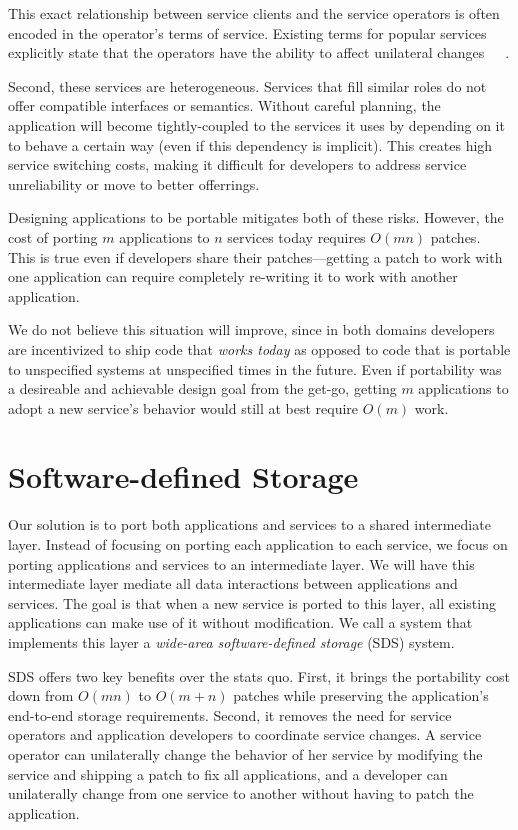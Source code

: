 This exact relationship between service clients and the service operators is often encoded
in the operator's terms of service.  Existing terms for popular services
explicitly state that the operators have the ability to affect unilateral
changes~\cite{amazon-tos}~\cite{google-tos}~\cite{dropbox-tos}.

Second, these services are heterogeneous.  Services that fill similar roles
do not offer compatible interfaces or semantics.
Without careful planning, the application will become tightly-coupled to the
services it uses by depending on it to behave a certain way (even if this
dependency is implicit).  This creates high service switching costs, making it
difficult for developers to address service unreliability or move to better
offerrings.

Designing applications to be portable mitigates both of
these risks.   However, the cost of porting $m$ applications to $n$ services
today requires $O(mn)$ patches.  This is true even if developers share their
patches---getting a patch to work with one application can require completely
re-writing it to work with another application.

We do not believe this situation will improve,
since in both domains developers are incentivized to ship code that \emph{works
today} as opposed to code that is portable to unspecified systems at unspecified
times in the future.
Even if portability was a desireable and achievable design goal from the get-go,
getting $m$ applications to adopt a new service's behavior would still at best require $O(m)$
work.

\section{Software-defined Storage}

Our solution is to port both applications and services to a shared
intermediate layer.  Instead of focusing on
porting each application to each service, we focus on porting applications and
services to an intermediate layer.  We will have this intermediate layer mediate all
data interactions between applications and services.  The goal is that when a new service
is ported to this layer, all existing applications can make use of it without
modification.  We call a system that implements this layer a
\textit{wide-area software-defined storage} (SDS) system.

SDS offers two key benefits over the stats quo.  First, it brings the portability cost down from
$O(mn)$ to $O(m + n)$ patches while preserving the application's end-to-end
storage requirements.  Second, it removes the need for service operators and
application developers to coordinate service changes.  A service operator can
unilaterally change the behavior of her service by modifying the service and
shipping a patch to fix all applications, and a developer can unilaterally
change from one service to another without having to patch the application.

